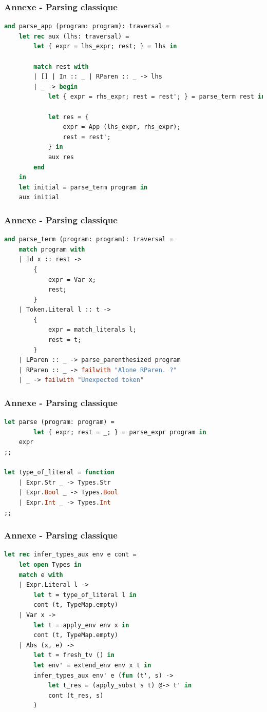 \documentclass{beamer}
\begin{document}
\begin{frame}[fragile]
		\frametitle{Annexe - Parsing classique}
		\begin{lstlisting}[language=ML]
and parse_app (program: program): traversal = 
    let rec aux (lhs: traversal) = 
        let { expr = lhs_expr; rest; } = lhs in

        match rest with
        | [] | In :: _ | RParen :: _ -> lhs
        | _ -> begin
            let { expr = rhs_expr; rest = rest'; } = parse_term rest in
            
            let res = {
                expr = App (lhs_expr, rhs_expr);
                rest = rest';
            } in
            aux res
        end
    in 
    let initial = parse_term program in
    aux initial
		\end{lstlisting}
	
\end{frame}
\begin{frame}[fragile]
		\frametitle{Annexe - Parsing classique}
		\begin{lstlisting}[language=ML]
and parse_term (program: program): traversal =
    match program with
    | Id x :: rest -> 
        { 
            expr = Var x; 
            rest;
        }
    | Token.Literal l :: t -> 
        {
            expr = match_literals l;
            rest = t;
        }  
    | LParen :: _ -> parse_parenthesized program
    | RParen :: _ -> failwith "Alone RParen. ?"
    | _ -> failwith "Unexpected token"
		\end{lstlisting}
	
\end{frame}
\begin{frame}[fragile]
		\frametitle{Annexe - Parsing classique}
		\begin{lstlisting}[language=ML]
let parse (program: program) =
		let { expr; rest = _; } = parse_expr program in
    expr
;;

let type_of_literal = function
    | Expr.Str _ -> Types.Str
    | Expr.Bool _ -> Types.Bool
    | Expr.Int _ -> Types.Int
;;
		\end{lstlisting}
\end{frame}
\begin{frame}[fragile]
		\frametitle{Annexe - Parsing classique}
		\begin{lstlisting}[language=ML]
let rec infer_types_aux env e cont = 
    let open Types in
    match e with
    | Expr.Literal l ->
        let t = type_of_literal l in
        cont (t, TypeMap.empty)
    | Var x ->
        let t = apply_env env x in
        cont (t, TypeMap.empty)
    | Abs (x, e) ->
        let t = fresh_tv () in
        let env' = extend_env env x t in
        infer_types_aux env' e (fun (t', s) ->
            let t_res = (apply_subst s t) @-> t' in
            cont (t_res, s)
        )
    
		\end{lstlisting}
\end{frame}
\end{document}
